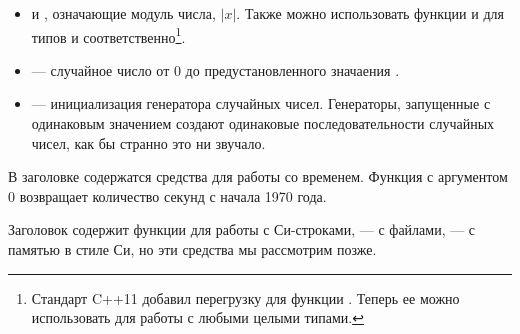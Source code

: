 \documentclass[book.tex]{subfiles}
\begin{document}
\begin{itemize}

\item {} и , означающие модуль числа, $|x|$. Также можно использовать функции  и  для типов  и  соответственно\footnote{Стандарт C++11 добавил перегрузку для функции . Теперь ее можно использовать для работы с любыми целыми типами.}.

\item {} --- случайное число от 0 до предустановленного значаения .

\item {} --- инициализация генератора случайных чисел. Генераторы, запущенные с одинаковым значением  создают одинаковые последовательности случайных чисел, как бы странно это ни звучало.

\end{itemize}

В заголовке  содержатся средства для работы со временем. Функция  с аргументом 0 возвращает количество секунд с начала 1970 года.


Заголовок  содержит функции для работы с Си-строками,  --- с файлами,  --- с памятью в стиле Си, но эти средства мы рассмотрим позже.
\end{document}
